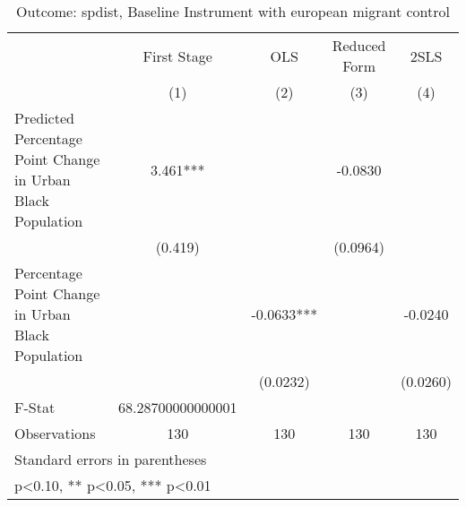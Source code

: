 \begin{table}[htbp]\centering
\def\sym#1{\ifmmode^{#1}\else\(^{#1}\)\fi}
\caption{Outcome: spdist, Baseline Instrument with european migrant control}
\begin{tabular}{l*{4}{c}}
\toprule
                    & First Stage   &         OLS   &Reduced Form   &        2SLS   \\
                    &\multicolumn{1}{c}{(1)}   &\multicolumn{1}{c}{(2)}   &\multicolumn{1}{c}{(3)}   &\multicolumn{1}{c}{(4)}   \\
\midrule
Predicted Percentage Point Change in Urban Black Population&       3.461***&               &     -0.0830   &               \\
                    &     (0.419)   &               &    (0.0964)   &               \\
\addlinespace
Percentage Point Change in Urban Black Population&               &     -0.0633***&               &     -0.0240   \\
                    &               &    (0.0232)   &               &    (0.0260)   \\
\midrule
F-Stat              &68.28700000000001   &               &               &               \\
Observations        &         130   &         130   &         130   &         130   \\
\bottomrule
\multicolumn{5}{l}{\footnotesize Standard errors in parentheses}\\
\multicolumn{5}{l}{\footnotesize * p<0.10, ** p<0.05, *** p<0.01}\\
\end{tabular}
\end{table}
